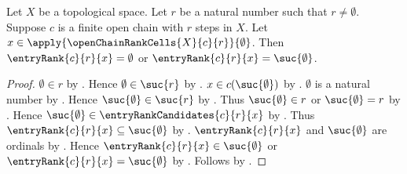 \begin{proposition}\label{open_chain_entry_rank_on_zero_cell}
    Let $X$ be a topological space.
    Let $r$ be a natural number such that $r\neq\emptyset$.
    Suppose $c$ is a finite open chain with $r$ steps in $X$.
    Let $x\in\apply{\openChainRankCells{X}{c}{r}}{\emptyset}$.
    Then $\entryRank{c}{r}{x}=\emptyset$ or
        $\entryRank{c}{r}{x}=\suc{\emptyset}$.
\end{proposition}
\begin{proof}
    $\emptyset\in r$ by .
    Hence $\emptyset\in\suc{r}$ by .
    $x\in c(\suc{\emptyset})$
        by .
    $\emptyset$ is a natural number by .
    Hence $\suc{\emptyset}\in\suc{r}$
        by .
    Thus $\suc{\emptyset}\in r$ or
        $\suc{\emptyset}=r$ by .
    Hence $\suc{\emptyset}
        \in\entryRankCandidates{c}{r}{x}$
        by .
    Thus $\entryRank{c}{r}{x}\subseteq\suc{\emptyset}$
        by .
    $\entryRank{c}{r}{x}$ and $\suc{\emptyset}$ are ordinals
        by
        .
    Hence $\entryRank{c}{r}{x}\in\suc{\emptyset}$ or
        $\entryRank{c}{r}{x}=\suc{\emptyset}$
        by .
    Follows by .
\end{proof}

